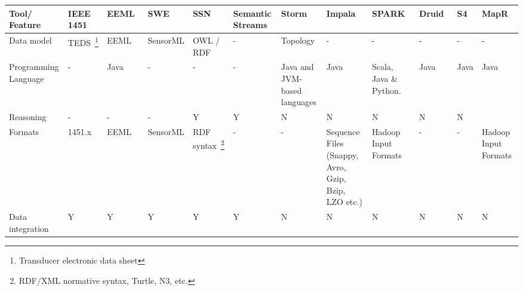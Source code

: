 \begin{sidewaystable}[!ht]
\renewcommand{\arraystretch}{1.3}
\tiny
\begin{center}
\begin{tabular}[c]{|p{1.7cm}|p{1.5cm}|p{1.5cm}|p{1.5cm}|p{1.5cm}|p{1.5cm}|p{1.5cm}|p{1.5cm}|p{1.5cm}|p{1.5cm}|p{1.5cm}|p{1.5cm}|} 
\hline
 \textbf{Tool/ Feature} & IEEE 1451 &  EEML~\cite{eeml} & SWE~\cite{sensorweb-wb} & SSN~\cite{Compton:2012:OPS:2400766.2401456} & Semantic Streams~\cite{Whitehouse:2006:SSF:2180141.2180148} & Storm~\cite{BigDataManing} & Impala~\cite{impala-project} & SPARK~\cite{zaharia2012discretized} & Druid~\cite{yangdruid} & S4~\cite{neumeyer2010s4}  & MapR~\cite{mapr-project}\\ \hline
  Data model & TEDS~\footnote{Transducer electronic data sheet} & EEML & SensorML & OWL / RDF & -  & Topology & - & - & - & - & - \\ \hline  
  Programming Language & - &  Java & - & -& - & Java and JVM-based languages & Java & Scala, Java \& Python. & Java & Java &  Java\\ \hline  
  Reasoning & - & - &  - & Y & Y & N & N & N & N &  N & \\ \hline  
  Formats & 1451.x & EEML & SensorML & RDF syntax~\footnote{RDF/XML normative syntax, Turtle, N3, etc.} & - & - & Sequence Files (Snappy, Avro, Gzip, Bzip, LZO etc.) & Hadoop Input Formats & - & - &Hadoop Input Formats \\ \hline  
  Data integration & Y & Y & Y  & Y & Y & N & N & N & N & N & N \\ \hline  

\end{tabular}
\end{center}
\end{sidewaystable}
